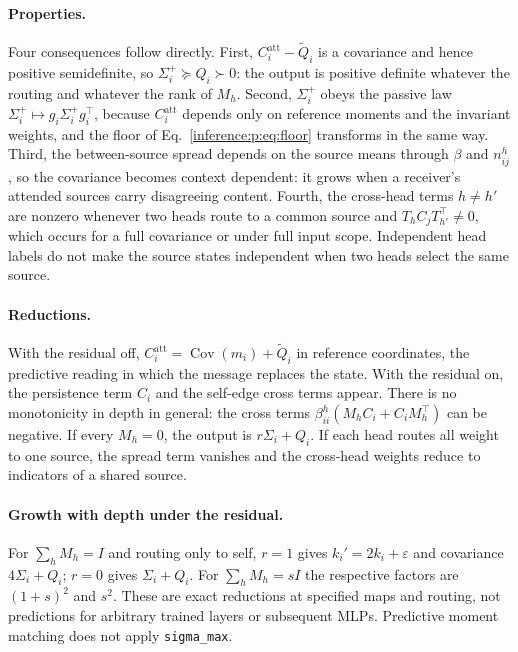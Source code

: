 \documentclass[11pt]{article}
\theoremstyle{definition}
\theoremstyle{remark}
\providecommand{\cfg}[1]{{\small\texttt{#1}}}
\providecommand{\Cov}{\operatorname{Cov}}
\begin{document}
\paragraph{Properties.}
Four consequences follow directly. First, $C_i^{\mathrm{att}}-\widetilde Q_i$ is a covariance and hence positive semidefinite, so $\Sigma_i^{+}\succeq Q_i\succ0$: the output is positive definite whatever the routing and whatever the rank of $M_h$. Second, $\Sigma_i^{+}$ obeys the passive law $\Sigma_i^{+}\mapsto g_i\Sigma_i^{+}g_i^{\top}$, because $C_i^{\mathrm{att}}$ depends only on reference moments and the invariant weights, and the floor of Eq.~\eqref{inference:p:eq:floor} transforms in the same way. Third, the between-source spread depends on the source means through $\beta$ and $n_{ij}^{h}$, so the covariance becomes context dependent: it grows when a receiver's attended sources carry disagreeing content. Fourth, the cross-head terms $h\ne h'$ are nonzero whenever two heads route to a common source and $T_hC_jT_{h'}^{\top}\ne0$, which occurs for a full covariance or under full input scope. Independent head labels do not make the source states independent when two heads select the same source.

\paragraph{Reductions.}
With the residual off, $C_i^{\mathrm{att}}=\Cov(m_i)+\widetilde Q_i$ in reference coordinates, the predictive reading in which the message replaces the state. With the residual on, the persistence term $C_i$ and the self-edge cross terms appear. There is no monotonicity in depth in general: the cross terms $\beta_{ii}^{h}(M_hC_i+C_iM_h^{\top})$ can be negative. If every $M_h=0$, the output is $r\Sigma_i+Q_i$. If each head routes all weight to one source, the spread term vanishes and the cross-head weights reduce to indicators of a shared source.

\paragraph{Growth with depth under the residual.}
For $\sum_hM_h=I$ and routing only to self, $r=1$ gives $k_i'=2k_i+\varepsilon$ and covariance $4\Sigma_i+Q_i$; $r=0$ gives $\Sigma_i+Q_i$. For $\sum_hM_h=sI$ the respective factors are $(1+s)^2$ and $s^2$. These are exact reductions at specified maps and routing, not predictions for arbitrary trained layers or subsequent MLPs. Predictive moment matching does not apply \cfg{sigma\_max}.
\end{document}
